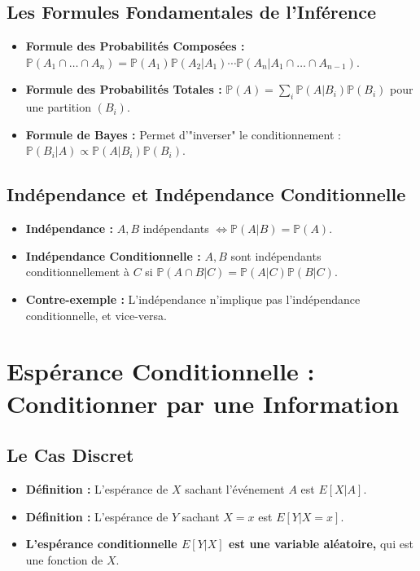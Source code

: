 \documentclass[12pt, a4paper, parskip=full]{report}
\theoremstyle{agregstyle}
\begin{document}
\subsection{Les Formules Fondamentales de l'Inférence}
\begin{itemize}
    \item \textbf{Formule des Probabilités Composées :} $\mathbb{P}(A_1 \cap \dots \cap A_n) = \mathbb{P}(A_1) \mathbb{P}(A_2|A_1) \cdots \mathbb{P}(A_n | A_1 \cap \dots \cap A_{n-1})$.
    \item \textbf{Formule des Probabilités Totales :} $\mathbb{P}(A) = \sum_i \mathbb{P}(A|B_i)\mathbb{P}(B_i)$ pour une partition $(B_i)$.
    \item \textbf{Formule de Bayes :} Permet d'"inverser" le conditionnement : $\mathbb{P}(B_i|A) \propto \mathbb{P}(A|B_i)\mathbb{P}(B_i)$.
\end{itemize}
\subsection{Indépendance et Indépendance Conditionnelle}
\begin{itemize}
    \item \textbf{Indépendance :} $A,B$ indépendants $\iff \mathbb{P}(A|B) = \mathbb{P}(A)$.
    \item \textbf{Indépendance Conditionnelle :} $A,B$ sont indépendants conditionnellement à $C$ si $\mathbb{P}(A \cap B | C) = \mathbb{P}(A|C)\mathbb{P}(B|C)$.
    \item \textbf{Contre-exemple :} L'indépendance n'implique pas l'indépendance conditionnelle, et vice-versa.
\end{itemize}

\section{Espérance Conditionnelle : Conditionner par une Information}
\subsection{Le Cas Discret}
\begin{itemize}
    \item \textbf{Définition :} L'espérance de $X$ sachant l'événement $A$ est $E[X|A]$.
    \item \textbf{Définition :} L'espérance de $Y$ sachant $X=x$ est $E[Y|X=x]$.
    \item \textbf{L'espérance conditionnelle $E[Y|X]$ est une variable aléatoire,} qui est une fonction de $X$.
\end{itemize}
\end{document}
